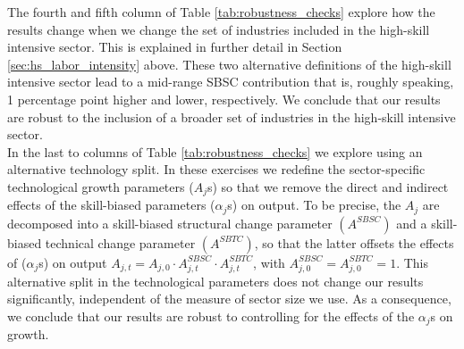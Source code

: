 \documentclass[10pt]{article}
\begin{document}
The fourth and fifth column of Table \ref{tab:robustness_checks} explore how the results change when we change the set of industries included in the high-skill intensive sector. This is explained in further detail in Section \ref{sec:hs_labor_intensity} above. These two alternative definitions of the high-skill intensive sector lead to a mid-range SBSC contribution that is, roughly speaking, 1 percentage point higher and lower, respectively. We conclude that our results are robust to the inclusion of a broader set of industries in the high-skill intensive sector.\\

In the last to columns of Table \ref{tab:robustness_checks} we explore using an alternative technology split. In these exercises we redefine the sector-specific technological growth parameters ($A_{j}$s) so that we remove the direct and indirect effects of the skill-biased parameters ($\alpha_{j}$s) on output. To be precise, the $A_{j}$ are decomposed into a skill-biased structural change parameter $\left(A^{SBSC}\right)$ and a skill-biased technical change parameter $\left(A^{SBTC}\right)$, so that the latter offsets the effects of ($\alpha_{j}$s) on output $A_{j,t}=A_{j,0} \cdot A^{SBSC}_{j,t} \cdot A^{SBTC}_{j,t}$, with $A^{SBSC}_{j,0}=A^{SBTC}_{j,0}=1$. This alternative split in the technological parameters does not change our results significantly, independent of the measure of sector size we use. As a consequence, we conclude that our results are robust to controlling for the effects of the $\alpha_{j}$s on growth.\\
\end{document}
